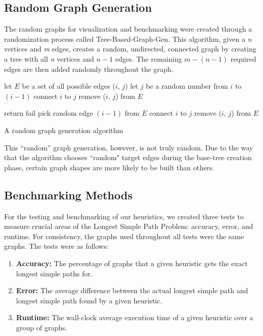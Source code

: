 \documentclass[twocolumn,showpacs,%
  nofootinbib,aps,superscriptaddress,%
  eqsecnum,prd,notitlepage,showkeys,11pt]{article}
\begin{document}
\subsection{Random Graph Generation}

The random graphs for visualization and benchmarking were created through a randomization process called Tree-Based-Graph-Gen. This algorithm, given a \textit{n} vertices and \textit{m} edges, creates a random, undirected, connected graph by creating a tree with all \textit{n} vertices and \(n-1\) edges. The remaining \(m - (n - 1)\) required edges are then added randomly throughout the graph.

\begin{algorithm}
\begin{algorithmic}

\State let $E$ be a set of all possible edges ($i$, $j$)
    \State let $j$ be a random number from $i$ to $(i - 1)$
    \State connect $i$ to $j$
    \State remove ($i$, $j$) from $E$
\EndFor
    
        \State return fail
    \EndIf
    \State pick random edge $(i - 1)$ from $E$
    \State connect $i$ to $j$
    \State remove ($i$, $j$) from $E$
\EndFor

\end{algorithmic}
\caption{A random graph generation algorithm}\label{alg:RGG}
\end{algorithm}

This ``random'' graph generation, however, is not truly random. Due to the way that the algorithm chooses ``random" target edges during the base-tree creation phase, certain graph shapes are more likely to be built than others. 

\subsection{Benchmarking Methods}
For the testing and benchmarking of our heuristics, we created three tests to measure crucial areas of the Longest Simple Path Problem: accuracy, error, and runtime. For consistency, the graphs used throughout all tests were the same graphs. The tests were as follows:

\begin{enumerate}
    \item \textbf{Accuracy:} The percentage of graphs that a given heuristic gets the exact longest simple paths for.
    \item \textbf{Error:} The average difference between the actual longest simple path and longest simple path found by a given heuristic.
    \item \textbf{Runtime:} The wall-clock average execution time of a given heuristic over a group of graphs.
\end{enumerate}
\end{document}
